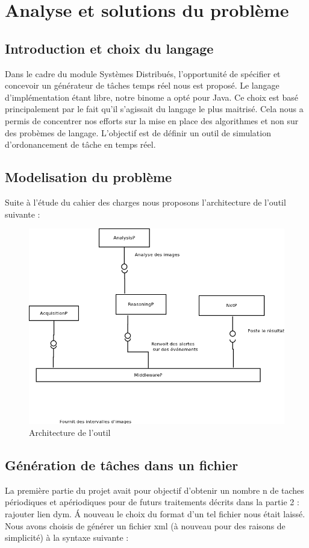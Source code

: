 \chapter{Analyse et solutions du problème}

\section{Introduction et choix du langage}
Dans le cadre du module Systèmes Distribués, l'opportunité de  spécifier et concevoir  un générateur de tâches temps réel nous est proposé. Le langage d'implémentation étant libre, notre binome a opté pour Java. Ce choix est basé principalement par le fait qu'il s'agissait du langage le plus maitrisé. Cela nous a permis de concentrer nos efforts sur la mise en place des algorithmes et non sur des probèmes de langage.
 L'objectif est de définir un outil de simulation  d'ordonancement de tâche en temps réel.

\section{Modelisation du problème}
Suite à l'étude du cahier des charges nous proposons l'architecture de l'outil suivante :
   \begin{figure}[htbp]
  \centering
  \includegraphics[scale=0.70]{img/archi}
  \caption{Architecture de l'outil}
  \label{fig:archi}
\end{figure}
\section{Génération de tâches dans un fichier}
La première partie du projet avait pour objectif d'obtenir un nombre n de taches périodiques et apériodiques pour de futurs traitements décrits dans la partie 2 : rajouter lien dym. \'A nouveau le choix du format d'un tel fichier nous était laissé. Nous avons choisis de générer un fichier xml (à nouveau pour des raisons  de simplicité) à la syntaxe suivante : 

